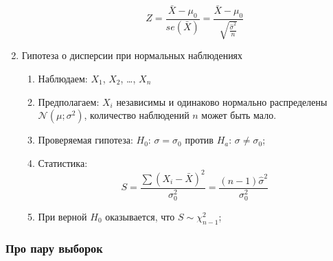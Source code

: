 \documentclass[12pt, a4paper]{article}
\newcommand{\cN}{\mathcal{N}}
\begin{document}
\begin{enumerate}
\begin{enumerate}
	\[
	  Z = \frac{\bar X - \mu_0}{se(\bar X)} = \frac{\bar X - \mu_0}{\sqrt{\frac{\hat \sigma^2}{n}}}
	\]


  \end{enumerate}


  \item Гипотеза о дисперсии при нормальных наблюдениях
    \begin{enumerate}

      \item Наблюдаем: $X_1$, $X_2$, \ldots, $X_n$

      \item Предполагаем: $X_i$ независимы и одинаково нормально распределены $\cN(\mu; \sigma^2)$, количество наблюдений $n$ может быть мало.

      \item Проверяемая гипотеза: $H_0$: $\sigma = \sigma_0$ против $H_a$: $\sigma \neq \sigma_0$;

      \item Статистика:
	\[
	  S = \frac{\sum (X_i - \bar X)^2}{\sigma_0^2} = \frac{(n-1)\hat\sigma^2}{\sigma_0^2}
      \]

    \item При верной $H_0$ оказывается, что $S \sim \chi^2_{n-1}$;


    \end{enumerate}

\end{enumerate}


\subsubsection{Про пару выборок}
\end{document}
